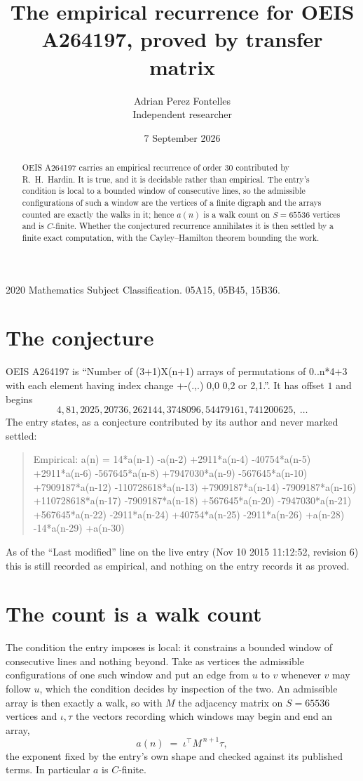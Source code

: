 \documentclass[11pt,a4paper]{article}
\title{The empirical recurrence for OEIS A264197, proved by transfer matrix}
\author{Adrian Perez Fontelles\\ \small Independent researcher}
\date{7 September 2026}
\theoremstyle{plain}
\theoremstyle{definition}
\begin{document}
\maketitle

\begin{abstract}
OEIS A264197 carries an empirical recurrence of order $30$ contributed by R.~H.~Hardin. It is
true, and it is decidable rather than empirical. The entry's condition is local to a bounded window of consecutive lines, so
the admissible configurations of such a window are the vertices of a finite digraph and the
arrays counted are exactly the walks in it; hence $a(n)$ is a walk count on $S=65536$ vertices
and is $C$-finite. Whether the conjectured recurrence annihilates it is then settled by a
finite exact computation, with the Cayley--Hamilton theorem bounding the work.
\end{abstract}

\noindent\small 2020 Mathematics Subject Classification. 05A15, 05B45, 15B36.\normalsize

\section{The conjecture}

OEIS A264197 is ``Number of (3+1)X(n+1) arrays of permutations of 0..n*4+3 with each element having index change +-(.,.) 0,0 0,2 or 2,1.''. It has offset $1$ and begins
\[
4, 81, 2025, 20736, 262144, 3748096, 54479161, 741200625,\ \dots
\]
The entry states, as a conjecture contributed by its author and never marked settled:
\begin{quote}
Empirical: a(n) = 14*a(n-1) -a(n-2) +2911*a(n-4) -40754*a(n-5) +2911*a(n-6) -567645*a(n-8) +7947030*a(n-9) -567645*a(n-10) +7909187*a(n-12) -110728618*a(n-13) +7909187*a(n-14) -7909187*a(n-16) +110728618*a(n-17) -7909187*a(n-18) +567645*a(n-20) -7947030*a(n-21) +567645*a(n-22) -2911*a(n-24) +40754*a(n-25) -2911*a(n-26) +a(n-28) -14*a(n-29) +a(n-30)
\end{quote}
As of the ``Last modified'' line on the live entry (Nov 10 2015 11:12:52, revision 6) this is still
recorded as empirical, and nothing on the entry records it as proved.

\section{The count is a walk count}

The condition the entry imposes is local: it constrains a bounded window of consecutive lines and nothing beyond. Take as
vertices the admissible configurations of one such window and put an edge from $u$ to $v$
whenever $v$ may follow $u$, which the condition decides by inspection of the two. An
admissible array is then exactly a walk, so with $M$ the adjacency matrix on $S=65536$ vertices
and $\iota,\tau$ the vectors recording which windows may begin and end an array,
\[
a(n)\;=\;\iota^{\!\top}M^{\,n+1}\tau ,
\]
the exponent fixed by the entry's own shape and checked against its published terms. In
particular $a$ is $C$-finite.
\end{document}
